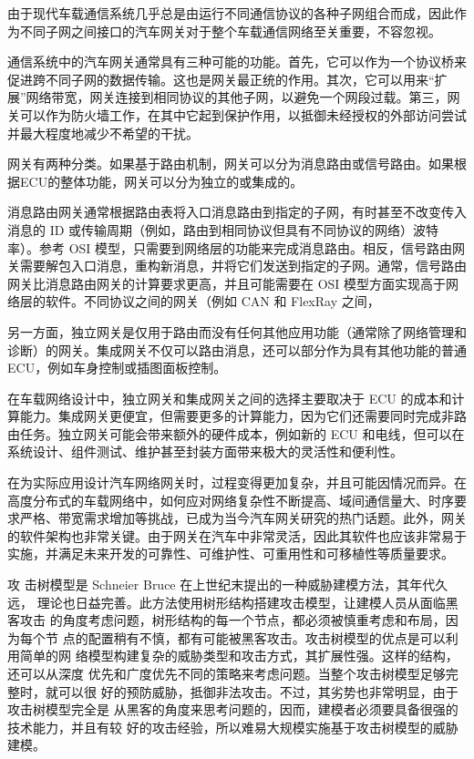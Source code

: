 由于现代车载通信系统几乎总是由运行不同通信协议的各种子网组合而成，因此作为不同子网之间接口的汽车网关对于整个车载通信网络至关重要，不容忽视。

通信系统中的汽车网关通常具有三种可能的功能。首先，它可以作为一个协议桥来促进跨不同子网的数据传输。这也是网关最正统的作用。其次，它可以用来“扩展”网络带宽，网关连接到相同协议的其他子网，以避免一个网段过载。第三，网关可以作为防火墙工作，在其中它起到保护作用，以抵御未经授权的外部访问尝试并最大程度地减少不希望的干扰。

网关有两种分类。如果基于路由机制，网关可以分为消息路由或信号路由。如果根据ECU的整体功能，网关可以分为独立的或集成的。

消息路由网关通常根据路由表将入口消息路由到指定的子网，有时甚至不改变传入消息的 ID 或传输周期（例如，路由到相同协议但具有不同协议的网络）波特率）。参考 OSI 模型，只需要到网络层的功能来完成消息路由。相反，信号路由网关需要解包入口消息，重构新消息，并将它们发送到指定的子网。通常，信号路由网关比消息路由网关的计算要求更高，并且可能需要在 OSI 模型方面实现高于网络层的软件。不同协议之间的网关（例如 CAN 和 FlexRay 之间，

另一方面，独立网关是仅用于路由而没有任何其他应用功能（通常除了网络管理和诊断）的网关。集成网关不仅可以路由消息，还可以部分作为具有其他功能的普通 ECU，例如车身控制或插图面板控制。

在车载网络设计中，独立网关和集成网关之间的选择主要取决于 ECU 的成本和计算能力。集成网关更便宜，但需要更多的计算能力，因为它们还需要同时完成非路由任务。独立网关可能会带来额外的硬件成本，例如新的 ECU 和电线，但可以在系统设计、组件测试、维护甚至封装方面带来极大的灵活性和便利性。

在为实际应用设计汽车网络网关时，过程变得更加复杂，并且可能因情况而异。在高度分布式的车载网络中，如何应对网络复杂性不断提高、域间通信量大、时序要求严格、带宽需求增加等挑战，已成为当今汽车网关研究的热门话题。此外，网关的软件架构也非常关键。由于网关在汽车中非常灵活，因此其软件也应该非常易于实施，并满足未来开发的可靠性、可维护性、可重用性和可移植性等质量要求。


攻
击树模型是 Schneier Bruce 在上世纪末提出的一种威胁建模方法\cite{schneier1999attack}，其年代久远，
理论也日益完善。此方法使用树形结构搭建攻击模型，让建模人员从面临黑客攻击
的角度考虑问题，树形结构的每一个节点，都必须被慎重考虑和布局，因为每个节
点的配置稍有不慎，都有可能被黑客攻击。攻击树模型的优点是可以利用简单的网
络模型构建复杂的威胁类型和攻击方式，其扩展性强。这样的结构，还可以从深度
优先和广度优先不同的策略来考虑问题。当整个攻击树模型足够完整时，就可以很
好的预防威胁，抵御非法攻击。不过，其劣势也非常明显，由于攻击树模型完全是
从黑客的角度来思考问题的，因而，建模者必须要具备很强的技术能力，并且有较
好的攻击经验，所以难易大规模实施基于攻击树模型的威胁建模。


